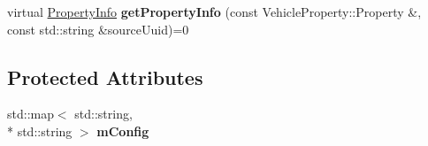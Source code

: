 \begin{DoxyCompactItemize}
\item 
\hypertarget{classAbstractRoutingEngine_aa54d896b08870c24ae503a347681a439}{virtual \hyperlink{classPropertyInfo}{Property\+Info} {\bfseries get\+Property\+Info} (const Vehicle\+Property\+::\+Property \&, const std\+::string \&source\+Uuid)=0}\label{classAbstractRoutingEngine_aa54d896b08870c24ae503a347681a439}

\end{DoxyCompactItemize}
\subsection*{Protected Attributes}
\begin{DoxyCompactItemize}
\item 
\hypertarget{classAbstractRoutingEngine_a84ecc2385f6cde8a0971a58ad6f7cd3f}{std\+::map$<$ std\+::string, \\*
std\+::string $>$ {\bfseries m\+Config}}\label{classAbstractRoutingEngine_a84ecc2385f6cde8a0971a58ad6f7cd3f}

\end{DoxyCompactItemize}


